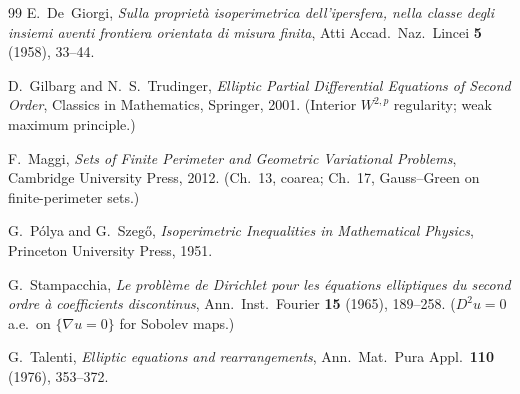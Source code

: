 \documentclass[11pt]{amsart}
\theoremstyle{definition}
\begin{document}
\begin{thebibliography}{99}
E.~De~Giorgi,
\emph{Sulla propriet\`a isoperimetrica dell'ipersfera, nella classe degli
insiemi aventi frontiera orientata di misura finita},
Atti Accad.\ Naz.\ Lincei \textbf{5} (1958), 33--44.

D.~Gilbarg and N.~S.~Trudinger,
\emph{Elliptic Partial Differential Equations of Second Order},
Classics in Mathematics, Springer, 2001.
(Interior \(W^{2,p}\) regularity; weak maximum principle.)

F.~Maggi,
\emph{Sets of Finite Perimeter and Geometric Variational Problems},
Cambridge University Press, 2012.
(Ch.~13, coarea; Ch.~17, Gauss--Green on finite-perimeter sets.)

G.~P\'olya and G.~Szeg\H{o},
\emph{Isoperimetric Inequalities in Mathematical Physics},
Princeton University Press, 1951.

G.~Stampacchia,
\emph{Le probl\`eme de Dirichlet pour les \'equations elliptiques du second
ordre \`a coefficients discontinus},
Ann.\ Inst.\ Fourier \textbf{15} (1965), 189--258.
(\(D^2u=0\) a.e.\ on \(\{\nabla u=0\}\) for Sobolev maps.)

G.~Talenti,
\emph{Elliptic equations and rearrangements},
Ann.\ Mat.\ Pura Appl.\ \textbf{110} (1976), 353--372.

\end{thebibliography}
\end{document}
